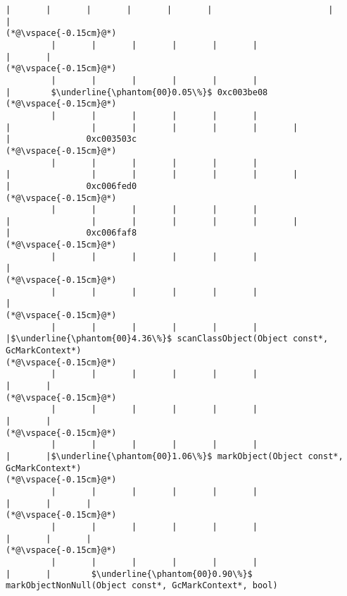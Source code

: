\begin{lstlisting}[caption=NewDirectByteBuffer, label=profile:C2JNewDirectBuffer-512, numberbychapter=true, frame=lines, float, floatplacement=t]
         |       |       |       |       |       |                       |       |
(*@\vspace{-0.15cm}@*)
         |       |       |       |       |       |                       |       |
(*@\vspace{-0.15cm}@*)
         |       |       |       |       |       |                       |        $\underline{\phantom{00}0.05\%}$ 0xc003be08
(*@\vspace{-0.15cm}@*)
         |       |       |       |       |       |                       |                |       |       |       |       |       |                       |               0xc003503c
(*@\vspace{-0.15cm}@*)
         |       |       |       |       |       |                       |                |       |       |       |       |       |                       |               0xc006fed0
(*@\vspace{-0.15cm}@*)
         |       |       |       |       |       |                       |                |       |       |       |       |       |                       |               0xc006faf8
(*@\vspace{-0.15cm}@*)
         |       |       |       |       |       |                       |
(*@\vspace{-0.15cm}@*)
         |       |       |       |       |       |                       |
(*@\vspace{-0.15cm}@*)
         |       |       |       |       |       |                       |$\underline{\phantom{00}4.36\%}$ scanClassObject(Object const*, GcMarkContext*)
(*@\vspace{-0.15cm}@*)
         |       |       |       |       |       |                       |       |
(*@\vspace{-0.15cm}@*)
         |       |       |       |       |       |                       |       |
(*@\vspace{-0.15cm}@*)
         |       |       |       |       |       |                       |       |$\underline{\phantom{00}1.06\%}$ markObject(Object const*, GcMarkContext*)
(*@\vspace{-0.15cm}@*)
         |       |       |       |       |       |                       |       |       |
(*@\vspace{-0.15cm}@*)
         |       |       |       |       |       |                       |       |       |
(*@\vspace{-0.15cm}@*)
         |       |       |       |       |       |                       |       |        $\underline{\phantom{00}0.90\%}$ markObjectNonNull(Object const*, GcMarkContext*, bool)

\end{lstlisting}
